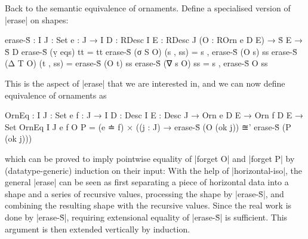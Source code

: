 Back to the semantic equivalence of ornaments.
Define a specialised version of |erase| on shapes:
\begin{code}
erase-Ṡ :  {I J : Set} {e : J → I} {D : RDesc I} {E : RDesc J}
           (O : ROrn e D E) → Ṡ E → Ṡ D
erase-Ṡ (ṿ eqs)  tt        = tt
erase-Ṡ (σ S O)  (s , ss)  = s ,  erase-Ṡ (O s)  ss
erase-Ṡ (Δ T O)  (t , ss)  =      erase-Ṡ (O t)  ss
erase-Ṡ (∇ s O)  ss        = s ,  erase-Ṡ O      ss
\end{code}
This is the aspect of |erase| that we are interested in, and we can now define equivalence of ornaments as
\begin{code}
OrnEq :  {I J : Set} {e f : J → I} {D : Desc I} {E : Desc J} →
         Orn e D E → Orn f D E → Set
OrnEq {I} {J} {e} {f} O P =
  (e ≐ f) × ((j : J) → erase-Ṡ (O (ok j)) ≊' erase-Ṡ (P (ok j)))
\end{code}
which can be proved to imply pointwise equality of |forget O| and |forget P| by (datatype-generic) induction on their input:
With the help of |horizontal-iso|, the general |erase| can be seen as first separating a piece of horizontal data into a shape and a series of recursive values, processing the shape by |erase-Ṡ|, and combining the resulting shape with the recursive values.
Since the real work is done by |erase-Ṡ|, requiring extensional equality of |erase-Ṡ| is sufficient.
This argument is then extended vertically by induction.


